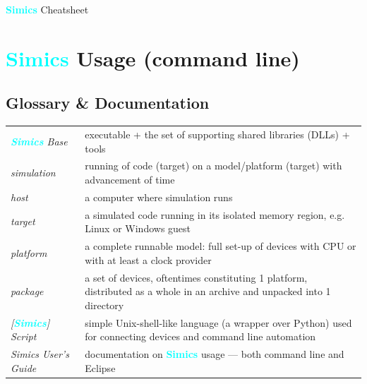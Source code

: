 \documentclass[8pt]{extarticle}
\newcommand{\cod}[2][green!10]{\tcbox[
    size=fbox,
    on line,
    colback=#1,
    colframe=black,
    arc=0.3em  %
]{#2}}
\newcommand{\Simics}{\textcolor{cyan}{\textbf{Simics}}}
\newlength{\MyLen}
\begin{document}
\setlength\emergencystretch{\hsize}


\ifdefined\cheatsheetCompact
\begin{multicols*}{3}
\fi
    {\Large\centering \Simics{} Cheatsheet\par}

\ifdefined\cheatsheetCompact
\vspace{0.1cm}
\fi

\section{\Simics{} Usage (command line)}

\subsection{Glossary \& Documentation}
    \noindent\begin{tabular}{p{\the\MyLen}p{\linewidth-\the\MyLen-0.8cm}}
        \textit{\Simics{} Base} & \cod{simics} executable + the set of
        supporting shared libraries (DLLs) + tools
        \\
        \textit{simulation}  & running of code (target) on
        a model/platform (target) with advancement of time
        \\
        \textit{host}        & a computer where simulation runs
        \\
        \textit{target}      & a simulated
        code running in its isolated memory region, e.g. Linux or
        Windows guest
        \\
        \textit{platform}  & a complete runnable model:
        full set-up of devices
        with CPU or with at least a clock provider
        \\
        \textit{package}   & a set of devices, oftentimes constituting
        1 platform, distributed as a whole in an archive and unpacked
        into 1 directory
        \\
        \textit{[\Simics] Script} & simple Unix-shell-like language (a wrapper
        over Python) used for connecting devices and command line 
        automation
        \\
        \textit{Simics User’s Guide} & documentation on \Simics{}
        usage — both command line and Eclipse
    \end{tabular}


\end{multicols*}
\end{document}
